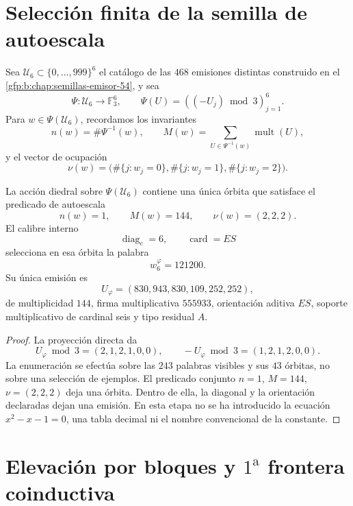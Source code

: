 
\label{gfp:b:chap:biografia-completa-phi}

\section{Selección finita de la semilla de autoescala}

Sea \(\mathcal U_6\subset\{0,\ldots,999\}^6\) el catálogo de las
\(468\) emisiones distintas construido en el
\cref{gfp:b:chap:semillas-emisor-54}, y sea
\[
 \Psi:\mathcal U_6\longrightarrow\mathbb F_3^6,
 \qquad
 \Psi(U)=((-U_j)\bmod3)_{j=1}^{6}.
\]
Para \(w\in\Psi(\mathcal U_6)\), recordamos los invariantes
\[
 n(w)=\#\Psi^{-1}(w),
 \qquad
 M(w)=\sum_{U\in\Psi^{-1}(w)}\operatorname{mult}(U),
\]
y el vector de ocupación
\[
 \nu(w)=
 \bigl(\#\{j:w_j=0\},\#\{j:w_j=1\},\#\{j:w_j=2\}\bigr).
\]

\begin{theorem}
\label{gfp:b:thm:seleccion-orbital-phi}
La acción diedral sobre \(\Psi(\mathcal U_6)\) contiene una única órbita
que satisface el predicado de autoescala
\[
 n(w)=1,
 \qquad
 M(w)=144,
 \qquad
 \nu(w)=(2,2,2).
\]
El calibre interno
\[
 \operatorname{diag}_c=6,
 \qquad
 \operatorname{card}=ES
\]
selecciona en esa órbita la palabra
\[
 \boxed{w_6^{\varphi}=121200.}
\]
Su única emisión es
\[
 \boxed{U_{\varphi}=(830,943,830,109,252,252),}
\]
de multiplicidad \(144\), firma multiplicativa \(555933\), orientación
aditiva \(ES\), soporte multiplicativo de cardinal seis y tipo residual
\(A\).
\end{theorem}

\begin{proof}
La proyección directa da
\[
 U_{\varphi}\bmod3=(2,1,2,1,0,0),
 \qquad
 -U_{\varphi}\bmod3=(1,2,1,2,0,0).
\]
La enumeración se efectúa sobre las \(243\) palabras visibles y sus
\(43\) órbitas, no sobre una selección de ejemplos. El predicado conjunto
\(n=1\), \(M=144\), \(\nu=(2,2,2)\) deja una órbita. Dentro de ella, la
diagonal y la orientación declaradas dejan una emisión. En esta etapa no
se ha introducido la ecuación \(x^2-x-1=0\), una tabla decimal ni el nombre
convencional de la constante.
\end{proof}

\section{Elevación por bloques y \(1^{\mathrm a}\) frontera coinductiva}

